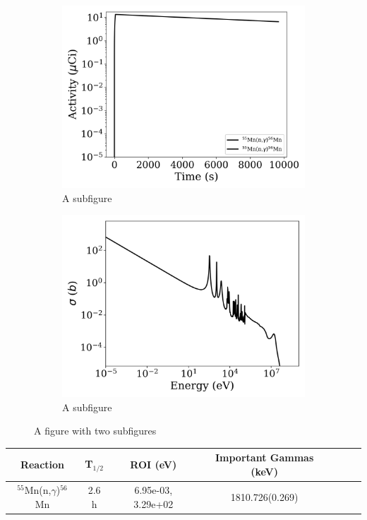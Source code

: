 \begin{figure}[h]
\centering
\begin{subfigure}{.5\textwidth}
  \centering
     \includegraphics[width=.8\textwidth]{plot/Mn-55(n,gamma)Mn-56_library1} 

  \caption{A subfigure}
  \label{fig:sub1}
\end{subfigure}%
\begin{subfigure}{.5\textwidth}
  \centering
     \includegraphics[width=.8\textwidth]{plot/Mn-55(n,gamma)Mn-56} 

  \caption{A subfigure}
  \label{fig:sub2}
\end{subfigure}
\caption{A figure with two subfigures}
\label{fig:test}
\end{figure}

\begin{table}[h]
\centering
\begin{tabular}{ |c|c|c|c|c|c|c| }
 \hline
 Reaction & T$_{1/2}$ & ROI (eV) & Important Gammas (keV) \\
 \hline 
 $^{55}$Mn(n,$\gamma$)$^{56}$Mn &  2.6 h & 6.95e-03, 3.29e+02 & 1810.726(0.269) \\ 
\hline
\end{tabular}
\end{table}
